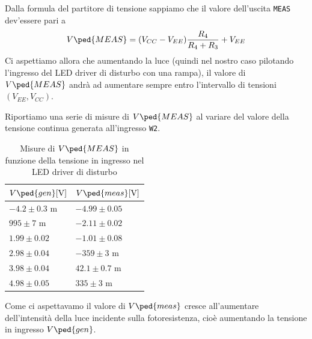 \documentclass[10pt, a4paper, italian]{article}
\begin{document}
Dalla formula del partitore di tensione sappiamo che il valore dell'uscita
\verb+MEAS+ dev'essere pari a
\begin{equation}
V\ped{MEAS} = (V_{CC} -  V_{EE})\frac{R_4}{R_4 + R_3} + V_{EE}
\end{equation}
Ci aspettiamo allora che aumentando la luce (quindi nel nostro caso pilotando
l'ingresso del LED driver di disturbo con una rampa), il valore di
$V\ped{MEAS}$ andrà ad aumentare sempre entro l'intervallo di tensioni
$(V_{EE}, V_{CC})$.

Riportiamo una serie di misure di $V\ped{MEAS}$ al variare del valore della
tensione continua generata all'ingresso \verb+W2+.
\begin{table}[htbp]
\centering
\begin{tabular}{@{}ll@{}}
\toprule
$V\ped{gen} [\si{\V}]$ & $V\ped{meas} [\si{\V}]$\\
\midrule
$-4.2 \pm 0.3$ m 	& $ -4.99 \pm 0.05$	\\
$995 \pm 7$ m 	& $ -2.11 \pm 0.02 $	\\
$1.99 \pm 0.02$ 	& $ -1.01 \pm 0.08 $\\
$2.98 \pm 0.04$ 	& $ -359 \pm 3 $ m\\
$3.98 \pm 0.04$ 	& $ 42.1 \pm 0.7 $ m\\
$4.98 \pm 0.05$ 	& $ 335 \pm 3$ m\\
\bottomrule
\end{tabular}
\caption{Misure di $V\ped{MEAS}$ in funzione della tensione in ingresso nel
LED driver di disturbo}
\end{table}
Come ci aspettavamo il valore di $V\ped{meas}$ cresce all'aumentare
dell'intensità della luce incidente sulla fotoresistenza, cioè aumentando la
tensione in ingresso $V\ped{gen}$.

\end{document}
